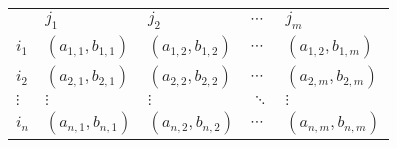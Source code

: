 \begin{center}
    \begin{tabular}{lllll}
                                 & $j_1$                 & $j_2$                  & $\cdots$ & $j_m$                 \\ \cline{2-5}
    \multicolumn{1}{l|}{$i_1$}   & $(a_{1,1}, b_{1,1})$  & $(a_{1,2}, b_{1,2})$   & $\cdots$ & \multicolumn{1}{l|}{$(a_{1,2}, b_{1,m})$}  \\
    \multicolumn{1}{l|}{$i_2$}   & $(a_{2,1}, b_{2,1})$  & $(a_{2,2}, b_{2,2})$   & $\cdots$ & \multicolumn{1}{l|}{$(a_{2,m}, b_{2,m})$}  \\
    \multicolumn{1}{l|}{$\vdots$}& $\vdots$              & $\vdots$               & $\ddots$ & \multicolumn{1}{l|}{$\vdots$   }           \\
    \multicolumn{1}{l|}{$i_n$}   & $(a_{n,1}, b_{n,1})$  & $(a_{n,2}, b_{n,2})$   & $\cdots$ & \multicolumn{1}{l|}{$(a_{n,m}, b_{n,m})$}  \\ \cline{2-5}
    \end{tabular}
\end{center}